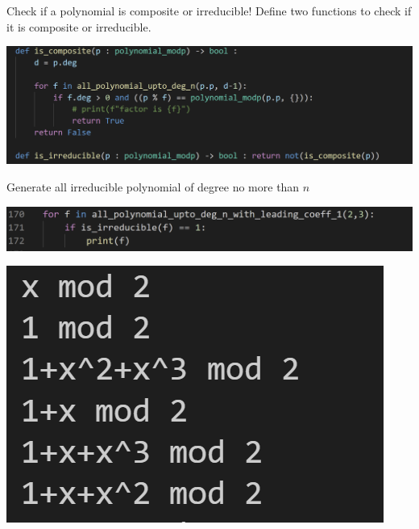 \documentclass{beamer}
\begin{document}
\begin{frame}{Check if a polynomial is composite or irreducible!}
    Define two functions to check if it is composite or irreducible.
    \begin{center}
        \includegraphics[]{isirre.png}
    \end{center}
\end{frame}

\begin{frame}{Generate all irreducible polynomial of degree no more than $n$}
    \begin{center}
        \includegraphics[scale = .5]{allirre.png}
    \end{center}
    \begin{center}
        \includegraphics[]{allirreresult.png}
    \end{center}
\end{frame}
\end{document}
